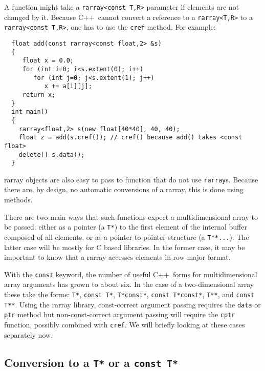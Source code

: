\documentclass[12pt,twoside]{article}
\newcommand{\cxx}{C{++}}
\begin{document}
A function might take a \texttt{rarray{\tt<}const T,R{\tt>}} parameter if elements are not changed by it. Because \cxx\ cannot convert a reference to a \texttt{rarray{\tt<}T,R{\tt>}} to a \texttt{rarray{\tt<}const T,R{\tt>}}, one has to use the \texttt{cref} method.
For example:
\vspace{-5pt}\begin{framed}\vspace{-14pt}%
\begin{verbatim}
  float add(const rarray<const float,2> &s) 
  {
     float x = 0.0;
     for (int i=0; i<s.extent(0); i++)
        for (int j=0; j<s.extent(1); j++)
           x += a[i][j];
     return x;
  }
  int main() 
  {
    rarray<float,2> s(new float[40*40], 40, 40);
    float z = add(s.cref()); // cref() because add() takes <const float>
    delete[] s.data();
  }
\end{verbatim}
\vspace{-14pt}
\end{framed}\vspace{-8pt}

rarray objects are also easy to pass to function that do not use \texttt{rarray}s. Because there are, by design, no automatic conversions of a
rarray, this is done using methods.

There are two main ways that such functions expect a multidimensional
array to be passed: either as a pointer (a \texttt{T*}) to the first
element of the internal buffer composed of all elements, or as a
pointer-to-pointer structure (a \texttt{T**...}).  The latter case
will be mostly for C based libraries.  In the former case, it may be
important to know that a rarray accesses elements in row-major
format.

With the \texttt{const} keyword, the number of useful \cxx\ forms for multidimensional array arguments has grown to about six.  In the case of a two-dimensional array these take the forms:
 \texttt{T*}, \texttt{const T*}, \texttt{T*const*}, \texttt{const T*const*}, \texttt{T**}, and \texttt{const T**}.
Using the rarray library, const-correct argument passing requires the \texttt{data} or \texttt{ptr} method but non-const-correct argument passing will require the \texttt{cptr} function, possibly combined with \texttt{cref}.
We will briefly looking at these cases separately now.

\subsection{Conversion to a {\tt T*} or a {\tt const T*}}
\end{document}
